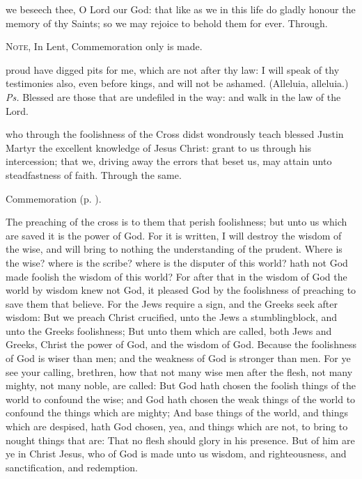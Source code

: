 \postcommunion
{} we beseech thee, O Lord our God: that like as we in this life do gladly honour the memory of thy Saints; so we may rejoice to behold them for ever. Through.


\clearpage
{}

\begin{rubric}
	\textsc{Note,} In Lent, Commemoration only is made.
\end{rubric}

\introit
{} proud have digged pits for me, which are not after thy law: I will speak of thy testimonies also, even before kings, and will not be ashamed. (Alleluia, alleluia.) \textit{Ps.} Blessed are those that are undefiled in the way: and walk in the law of the Lord.

\collect\label{JustinCollect}
 who through the foolishness of the Cross didst wondrously teach blessed Justin Martyr the excellent knowledge of Jesus Christ: grant to us through his intercession; that we, driving away the errors that beset us, may attain unto steadfastness of faith. Through the same.

\begin{rubric}
	Commemoration  (p. \pageref{TiburtiusCollect}).
\end{rubric}

 The preaching of the cross is to them that perish foolishness; but unto us which are saved it is the power of God. For it is written, I will destroy the wisdom of the wise, and will bring to nothing the understanding of the prudent. Where is the wise? where is the scribe? where is the disputer of this world? hath not God made foolish the wisdom of this world? For after that in the wisdom of God the world by wisdom knew not God, it pleased God by the foolishness of preaching to save them that believe. For the Jews require a sign, and the Greeks seek after wisdom: But we preach Christ crucified, unto the Jews a stumblingblock, and unto the Greeks foolishness; But unto them which are called, both Jews and Greeks, Christ the power of God, and the wisdom of God. Because the foolishness of God is wiser than men; and the weakness of God is stronger than men. For ye see your calling, brethren, how that not many wise men after the flesh, not many mighty, not many noble, are called: But God hath chosen the foolish things of the world to confound the wise; and God hath chosen the weak things of the world to confound the things which are mighty; And base things of the world, and things which are despised, hath God chosen, yea, and things which are not, to bring to nought things that are: That no flesh should glory in his presence. But of him are ye in Christ Jesus, who of God is made unto us wisdom, and righteousness, and sanctification, and redemption.

